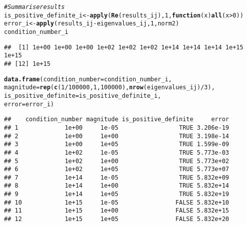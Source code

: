 \documentclass{article}\usepackage[]{graphicx}\usepackage[]{color}
\makeatletter
\newcommand{\hlnum}[1]{\textcolor[rgb]{0.686,0.059,0.569}{#1}}%
\newcommand{\hlcom}[1]{\textcolor[rgb]{0.678,0.584,0.686}{\textit{#1}}}%
\newcommand{\hlopt}[1]{\textcolor[rgb]{0,0,0}{#1}}%
\newcommand{\hlstd}[1]{\textcolor[rgb]{0.345,0.345,0.345}{#1}}%
\newcommand{\hlkwa}[1]{\textcolor[rgb]{0.161,0.373,0.58}{\textbf{#1}}}%
\newcommand{\hlkwb}[1]{\textcolor[rgb]{0.69,0.353,0.396}{#1}}%
\newcommand{\hlkwc}[1]{\textcolor[rgb]{0.333,0.667,0.333}{#1}}%
\newcommand{\hlkwd}[1]{\textcolor[rgb]{0.737,0.353,0.396}{\textbf{#1}}}%
\newenvironment{kframe}{%
 \def\at@end@of@kframe{}%
 \ifinner\ifhmode%
  \def\at@end@of@kframe{\end{minipage}}%
  \begin{minipage}{\columnwidth}%
 \fi\fi%
 \def\FrameCommand##1{\hskip\@totalleftmargin \hskip-\fboxsep
 \colorbox{shadecolor}{##1}\hskip-\fboxsep
     \hskip-\linewidth \hskip-\@totalleftmargin \hskip\columnwidth}%
 \MakeFramed {\advance\hsize-\width
   \@totalleftmargin\z@ \linewidth\hsize
   \@setminipage}}%
 {\par\unskip\endMakeFramed%
 \at@end@of@kframe}
\newenvironment{knitrout}{}{} %
\makeatother
\begin{document}
\begin{knitrout}
\begin{kframe}
\begin{alltt}
\hlcom{# Summarise results}
\hlstd{is_positive_definite_i} \hlkwb{<-} \hlkwd{apply}\hlstd{(}\hlkwd{Re}\hlstd{(results_ij),} \hlnum{1}\hlstd{,} \hlkwa{function}\hlstd{(}\hlkwc{x}\hlstd{)} \hlkwd{all}\hlstd{(x} \hlopt{>} \hlnum{0}\hlstd{))}
\hlstd{error_i} \hlkwb{<-} \hlkwd{apply}\hlstd{(results_ij} \hlopt{-} \hlstd{eigenvalues_ij,} \hlnum{1}\hlstd{, norm2)}
\hlstd{condition_number_i}
\end{alltt}
\begin{verbatim}
##  [1] 1e+00 1e+00 1e+00 1e+02 1e+02 1e+02 1e+14 1e+14 1e+14 1e+15 1e+15
## [12] 1e+15
\end{verbatim}
\begin{alltt}
\hlkwd{data.frame}\hlstd{(}\hlkwc{condition_number} \hlstd{= condition_number_i,}
           \hlkwc{magnitude} \hlstd{=} \hlkwd{rep}\hlstd{(}\hlkwd{c}\hlstd{(}\hlnum{1}\hlopt{/}\hlnum{100000}\hlstd{,} \hlnum{1}\hlstd{,} \hlnum{100000}\hlstd{),} \hlkwd{nrow}\hlstd{(eigenvalues_ij)}\hlopt{/}\hlnum{3}\hlstd{),}
           \hlkwc{is_positive_definite} \hlstd{= is_positive_definite_i,}
           \hlkwc{error} \hlstd{= error_i)}
\end{alltt}
\begin{verbatim}
##    condition_number magnitude is_positive_definite     error
## 1             1e+00     1e-05                 TRUE 3.206e-19
## 2             1e+00     1e+00                 TRUE 3.198e-14
## 3             1e+00     1e+05                 TRUE 1.599e-09
## 4             1e+02     1e-05                 TRUE 5.773e-03
## 5             1e+02     1e+00                 TRUE 5.773e+02
## 6             1e+02     1e+05                 TRUE 5.773e+07
## 7             1e+14     1e-05                 TRUE 5.832e+09
## 8             1e+14     1e+00                 TRUE 5.832e+14
## 9             1e+14     1e+05                 TRUE 5.832e+19
## 10            1e+15     1e-05                FALSE 5.832e+10
## 11            1e+15     1e+00                FALSE 5.832e+15
## 12            1e+15     1e+05                FALSE 5.832e+20
\end{verbatim}
\end{kframe}
\end{knitrout}
\end{document}
